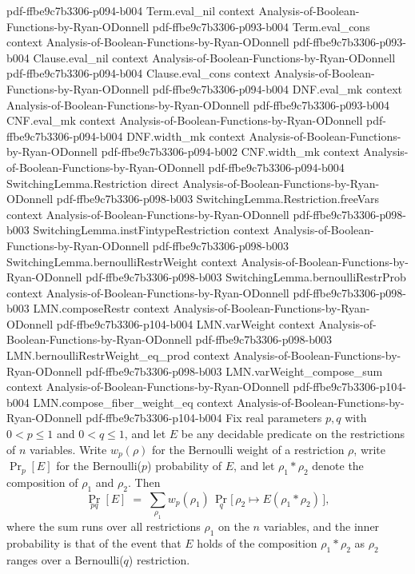 \begin{theorem}
  {pdf-ffbe9c7b3306-p094-b004}
\proofstep
  {Term.eval_nil}
  {context}
  {Analysis-of-Boolean-Functions-by-Ryan-ODonnell}
  {pdf-ffbe9c7b3306-p093-b004}
\proofstep
  {Term.eval_cons}
  {context}
  {Analysis-of-Boolean-Functions-by-Ryan-ODonnell}
  {pdf-ffbe9c7b3306-p093-b004}
\proofstep
  {Clause.eval_nil}
  {context}
  {Analysis-of-Boolean-Functions-by-Ryan-ODonnell}
  {pdf-ffbe9c7b3306-p094-b004}
\proofstep
  {Clause.eval_cons}
  {context}
  {Analysis-of-Boolean-Functions-by-Ryan-ODonnell}
  {pdf-ffbe9c7b3306-p094-b004}
\proofstep
  {DNF.eval_mk}
  {context}
  {Analysis-of-Boolean-Functions-by-Ryan-ODonnell}
  {pdf-ffbe9c7b3306-p093-b004}
\proofstep
  {CNF.eval_mk}
  {context}
  {Analysis-of-Boolean-Functions-by-Ryan-ODonnell}
  {pdf-ffbe9c7b3306-p094-b004}
\proofstep
  {DNF.width_mk}
  {context}
  {Analysis-of-Boolean-Functions-by-Ryan-ODonnell}
  {pdf-ffbe9c7b3306-p094-b002}
\proofstep
  {CNF.width_mk}
  {context}
  {Analysis-of-Boolean-Functions-by-Ryan-ODonnell}
  {pdf-ffbe9c7b3306-p094-b004}
\proofstep
  {SwitchingLemma.Restriction}
  {direct}
  {Analysis-of-Boolean-Functions-by-Ryan-ODonnell}
  {pdf-ffbe9c7b3306-p098-b003}
\proofstep
  {SwitchingLemma.Restriction.freeVars}
  {context}
  {Analysis-of-Boolean-Functions-by-Ryan-ODonnell}
  {pdf-ffbe9c7b3306-p098-b003}
\proofstep
  {SwitchingLemma.instFintypeRestriction}
  {context}
  {Analysis-of-Boolean-Functions-by-Ryan-ODonnell}
  {pdf-ffbe9c7b3306-p098-b003}
\proofstep
  {SwitchingLemma.bernoulliRestrWeight}
  {context}
  {Analysis-of-Boolean-Functions-by-Ryan-ODonnell}
  {pdf-ffbe9c7b3306-p098-b003}
\proofstep
  {SwitchingLemma.bernoulliRestrProb}
  {context}
  {Analysis-of-Boolean-Functions-by-Ryan-ODonnell}
  {pdf-ffbe9c7b3306-p098-b003}
\proofstep
  {LMN.composeRestr}
  {context}
  {Analysis-of-Boolean-Functions-by-Ryan-ODonnell}
  {pdf-ffbe9c7b3306-p104-b004}
\proofstep
  {LMN.varWeight}
  {context}
  {Analysis-of-Boolean-Functions-by-Ryan-ODonnell}
  {pdf-ffbe9c7b3306-p098-b003}
\proofstep
  {LMN.bernoulliRestrWeight_eq_prod}
  {context}
  {Analysis-of-Boolean-Functions-by-Ryan-ODonnell}
  {pdf-ffbe9c7b3306-p098-b003}
\proofstep
  {LMN.varWeight_compose_sum}
  {context}
  {Analysis-of-Boolean-Functions-by-Ryan-ODonnell}
  {pdf-ffbe9c7b3306-p104-b004}
\proofstep
  {LMN.compose_fiber_weight_eq}
  {context}
  {Analysis-of-Boolean-Functions-by-Ryan-ODonnell}
  {pdf-ffbe9c7b3306-p104-b004}
Fix real parameters $p, q$ with $0 < p \le 1$ and $0 < q \le 1$, and let $E$ be any
decidable predicate on the restrictions of $n$ variables. Write $w_p(\rho)$ for the
Bernoulli weight of a restriction $\rho$, write $\Pr_p[E]$ for the Bernoulli($p$)
probability of $E$, and let $\rho_1 * \rho_2$ denote the composition of $\rho_1$ and
$\rho_2$. Then
\[
\Pr_{pq}[E] \;=\; \sum_{\rho_1} w_p(\rho_1)\,\Pr_q\!\bigl[\,\rho_2 \mapsto E(\rho_1 *
\rho_2)\,\bigr],
\]
where the sum runs over all restrictions $\rho_1$ on the $n$ variables, and the inner
probability is that of the event that $E$ holds of the composition $\rho_1 * \rho_2$ as
$\rho_2$ ranges over a Bernoulli($q$) restriction.
\end{theorem}

